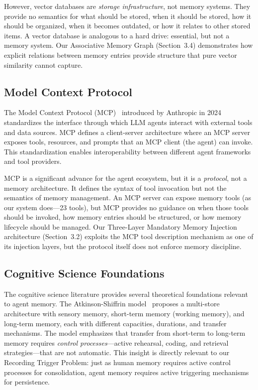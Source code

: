 \documentclass[11pt]{article}
\begin{document}
However, vector databases are \emph{storage infrastructure}, not memory systems. They provide no semantics for what should be stored, when it should be stored, how it should be organized, when it becomes outdated, or how it relates to other stored items. A vector database is analogous to a hard drive: essential, but not a memory system. Our Associative Memory Graph (Section~3.4) demonstrates how explicit relations between memory entries provide structure that pure vector similarity cannot capture.

\subsection{Model Context Protocol}

The Model Context Protocol (MCP)~\cite{anthropic2024mcp} introduced by Anthropic in 2024 standardizes the interface through which LLM agents interact with external tools and data sources. MCP defines a client-server architecture where an MCP server exposes tools, resources, and prompts that an MCP client (the agent) can invoke. This standardization enables interoperability between different agent frameworks and tool providers.

MCP is a significant advance for the agent ecosystem, but it is a \emph{protocol}, not a memory architecture. It defines the syntax of tool invocation but not the semantics of memory management. An MCP server can expose memory tools (as our system does---23 tools), but MCP provides no guidance on when those tools should be invoked, how memory entries should be structured, or how memory lifecycle should be managed. Our Three-Layer Mandatory Memory Injection architecture (Section~3.2) exploits the MCP tool description mechanism as one of its injection layers, but the protocol itself does not enforce memory discipline.

\subsection{Cognitive Science Foundations}

The cognitive science literature provides several theoretical foundations relevant to agent memory. The Atkinson-Shiffrin model~\cite{atkinson1968human} proposes a multi-store architecture with sensory memory, short-term memory (working memory), and long-term memory, each with different capacities, durations, and transfer mechanisms. The model emphasizes that transfer from short-term to long-term memory requires \emph{control processes}---active rehearsal, coding, and retrieval strategies---that are not automatic. This insight is directly relevant to our Recording Trigger Problem: just as human memory requires active control processes for consolidation, agent memory requires active triggering mechanisms for persistence.
\end{document}
